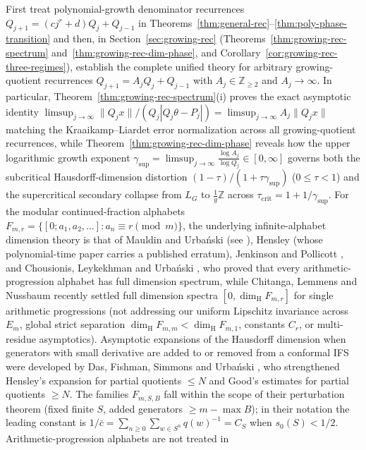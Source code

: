 \documentclass[11pt]{article}
\theoremstyle{definition}
\theoremstyle{remark}
\newcommand{\Z}{\mathbb{Z}}
\newcommand{\dimH}{\dim_{\mathrm{H}}}
\begin{document}
First treat polynomial-growth denominator recurrences
$Q_{j+1}=(cj^r+d)Q_j+Q_{j-1}$ in
Theorems~\ref{thm:general-rec}--\ref{thm:poly-phase-transition} and then, in
Section~\ref{sec:growing-rec} (Theorems~\ref{thm:growing-rec-spectrum}
and~\ref{thm:growing-rec-dim-phase}, and
Corollary~\ref{cor:growing-rec-three-regimes}), establish the complete unified
theory for arbitrary growing-quotient recurrences $Q_{j+1}=A_jQ_j+Q_{j-1}$ with
$A_j\in\Z_{\ge2}$ and $A_j\to\infty$. In particular, Theorem~\ref{thm:growing-rec-spectrum}(i)
proves the exact asymptotic identity
$\limsup_{j\to\infty}\|Q_jx\|/(Q_j|Q_j\theta-P_j|)=\limsup_{j\to\infty}A_j\|Q_jx\|$
matching the Kraaikamp--Liardet error normalization across all growing-quotient
recurrences, while Theorem~\ref{thm:growing-rec-dim-phase} reveals how the upper
logarithmic growth exponent $\gamma_{\sup}=\limsup_{j\to\infty}\frac{\log A_j}{\log Q_j}\in[0,\infty]$
governs both the subcritical Hausdorff-dimension distortion
$(1-\tau)/(1+\tau\gamma_{\sup})$ ($0\le\tau<1$) and the supercritical secondary
collapse from $L_G$ to $\frac{1}{g}\Z$ across $\tau_{\mathrm{crit}}=1+1/\gamma_{\sup}$.
For the modular continued-fraction alphabets $F_{m,r}=\{[0;a_1,a_2,\dots]:a_n\equiv r\pmod m\}$,
the underlying infinite-alphabet dimension theory is that of Mauldin and
Urba\'nski \cite{MU96} (see \cite[Theorem~2.3]{CLU}), Hensley \cite{Hensley1996}
(whose polynomial-time paper carries a published erratum), Jenkinson and
Pollicott \cite{JP2018}, and Chousionis, Leykekhman and Urba\'nski \cite{CLU},
who proved that every arithmetic-progression alphabet has full dimension
spectrum, while Chitanga, Lemmens and Nussbaum \cite{CLN2026} recently settled
full dimension spectra $[0,\dimH F_{m,r}]$ for single arithmetic progressions
(not addressing our uniform Lipschitz invariance across $E_m$, global strict
separation $\dimH F_{m,m}<\dimH F_{m,1}$, constants $C_r$, or multi-residue
asymptotics). Asymptotic expansions of the Hausdorff dimension when generators
with small derivative are added to or removed from a conformal IFS were
developed by Das, Fishman, Simmons and Urba\'nski \cite{DFSU}, who
strengthened Hensley's expansion \cite{Hensley92} for partial quotients $\le N$
and Good's estimates \cite{Good41} for partial quotients $\ge N$. The families
$F_{m,S,B}$ fall within the scope of their perturbation theorem
\cite[Theorem~4.1]{DFSU} (fixed finite $S$, added generators $\ge m-\max B$);
in their notation the leading constant is $1/\bar c=\sum_{n\ge0}\sum_{w\in S^n}q(w)^{-1}=C_S$
when $s_0(S)<1/2$. Arithmetic-progression alphabets are not treated in
\end{document}

